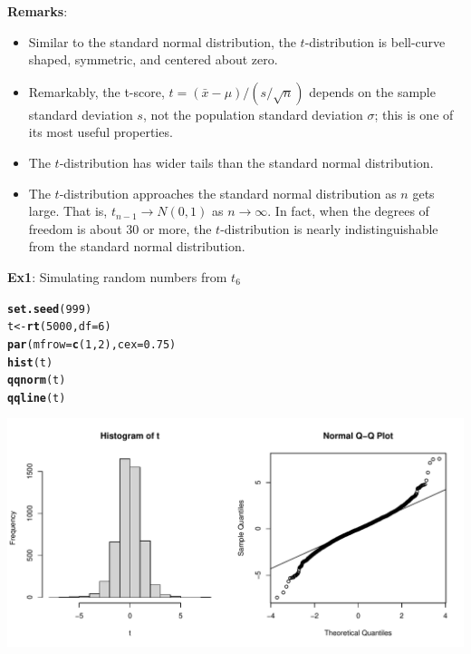 \documentclass[fleqn, 12pt]{article}\usepackage[]{graphicx}\usepackage[]{color}
\makeatletter
\def\maxwidth{ %
  \ifdim\Gin@nat@width>\linewidth
    \linewidth
  \else
    \Gin@nat@width
  \fi
}
\newcommand{\hlnum}[1]{\textcolor[rgb]{0.686,0.059,0.569}{#1}}%
\newcommand{\hlstd}[1]{\textcolor[rgb]{0.345,0.345,0.345}{#1}}%
\newcommand{\hlkwb}[1]{\textcolor[rgb]{0.69,0.353,0.396}{#1}}%
\newcommand{\hlkwc}[1]{\textcolor[rgb]{0.333,0.667,0.333}{#1}}%
\newcommand{\hlkwd}[1]{\textcolor[rgb]{0.737,0.353,0.396}{\textbf{#1}}}%
\newenvironment{kframe}{%
 \def\at@end@of@kframe{}%
 \ifinner\ifhmode%
  \def\at@end@of@kframe{\end{minipage}}%
  \begin{minipage}{\columnwidth}%
 \fi\fi%
 \def\FrameCommand##1{\hskip\@totalleftmargin \hskip-\fboxsep
 \colorbox{shadecolor}{##1}\hskip-\fboxsep
     \hskip-\linewidth \hskip-\@totalleftmargin \hskip\columnwidth}%
 \MakeFramed {\advance\hsize-\width
   \@totalleftmargin\z@ \linewidth\hsize
   \@setminipage}}%
 {\par\unskip\endMakeFramed%
 \at@end@of@kframe}
\newenvironment{knitrout}{}{} %
\makeatother
\begin{document}
\textbf{Remarks}:
\begin{itemize}
\item Similar to the standard normal distribution, the $t$-distribution is bell-curve shaped, symmetric, and centered about zero.
\item Remarkably, the t-score, $t=(\bar{x} - \mu)/(s / \sqrt{n})$ depends on the sample standard deviation $s$, not the population standard deviation $\sigma$; this is one of its most useful properties.
\item The $t$-distribution has wider tails than the standard normal distribution.
\item The $t$-distribution approaches the standard normal distribution as $n$ gets large.  That is, $t_{n-1} \rightarrow N(0,1)$ as $n \rightarrow \infty$.  In fact, when the degrees of freedom is about 30 or more, the $t$-distribution is nearly indistinguishable from the standard normal distribution.\\ %
\end{itemize}

\textbf{Ex1}: Simulating random numbers from $t_6$
\begin{knitrout}
\color{fgcolor}\begin{kframe}
\begin{alltt}
\hlkwd{set.seed}\hlstd{(}\hlnum{999}\hlstd{)}
\hlstd{t} \hlkwb{<-} \hlkwd{rt}\hlstd{(}\hlnum{5000}\hlstd{,} \hlkwc{df}\hlstd{=}\hlnum{6}\hlstd{)}
\hlkwd{par}\hlstd{(}\hlkwc{mfrow}\hlstd{=}\hlkwd{c}\hlstd{(}\hlnum{1}\hlstd{,}\hlnum{2}\hlstd{),} \hlkwc{cex}\hlstd{=}\hlnum{0.75}\hlstd{)}
\hlkwd{hist}\hlstd{(t)}
\hlkwd{qqnorm}\hlstd{(t)}
\hlkwd{qqline}\hlstd{(t)}
\end{alltt}
\end{kframe}
\includegraphics[width=\maxwidth]{figure/unnamed-chunk-2-1} 
\end{knitrout}
\clearpage
\end{document}
